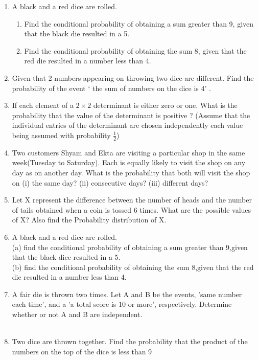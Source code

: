 \begin{enumerate}[label=\thechapter.\arabic*,ref=\thechapter.\theenumi]
\item A black and a red dice are rolled.
\begin{enumerate}
    \item Find the conditional probability of obtaining a sum greater than 9, given
that the black die resulted in a 5.
    \item Find the conditional probability of obtaining the sum 8, given that the red die
resulted in a number less than 4.
\end{enumerate}
		\solution
		
	\item Given that 2 numbers appearing on throwing two dice are different. Find the probability of the event ‘ the sum of numbers on the dice is 4’ .
		\\
		\solution
		
 \item If each element of a $2\times 2$ determinant is either zero or one. What is the probability that the value of the determinant is positive ? 
 (Assume that the individual entries of the determinant are chosen independently each value being assumed with probability $\frac{1}{2}$) \\
 \solution
		
\item Two customers Shyam and Ekta are visiting a particular shop in the same week(Tuesday to Saturday). Each is equally likely to visit the shop on any day as on another day. What is the probability that both will visit the shop on (i) the same day? (ii) consecutive days? (iii) different days?
\\
	
\item Let X represent the difference between the number of heads and the number of tails obtained when a coin is tossed 6 times. What are the possible values of X? Also find the Probability distribution of X.
\\
       
       \item A black and a red dice are rolled.\\
(a) find the conditional probability of obtaining a sum greater than 9,given that the black dice resulted in a 5.\\
(b) find the conditional probability of obtaining the sum 8,given that the red die resulted in a number less than 4.\\
\solution

\item A fair die is thrown two times. Let A and B be the events, 'same number each time', and a 'a total score is 10 or more', respectively. Determine whether or not A and B are independent.\\
\solution
\\

\item Two dice are thrown together. Find the probability that the product of the numbers on the top of the dice is less than 9\\ 

\end{enumerate}
 
